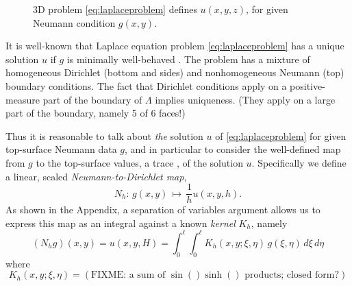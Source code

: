\documentclass[letterpaper,final,12pt,reqno]{amsart}
\theoremstyle{cstyle}
\theoremstyle{cstyle*}
\theoremstyle{dstyle}
\newcommand{\grad}{\nabla}
\begin{document}
\begin{figure}[ht]
\caption{3D problem \eqref{eq:laplaceproblem} defines $u(x,y,z)$, for given Neumann condition $g(x,y)$.}
\label{fig:laplaceproblem}
\end{figure}

It is well-known that Laplace equation problem \eqref{eq:laplaceproblem} has a unique solution $u$ if $g$ is minimally well-behaved \cite{Elmanetal2014,Evans2010}.  The problem has a mixture of homogeneous Dirichlet (bottom and sides) and nonhomogeneous Neumann (top) boundary conditions.  The fact that Dirichlet conditions apply on a positive-measure part of the boundary of $\Lambda$ implies uniqueness.  (They apply on a large part of the boundary, namely 5 of 6 faces!)

Thus it is reasonable to talk about \emph{the} solution $u$ of \eqref{eq:laplaceproblem} for given top-surface Neumann data $g$, and in particular to consider the well-defined map from $g$ to the top-surface values, a trace \cite{Evans2010}, of the solution $u$.  Specifically we define a linear, scaled \emph{Neumann-to-Dirichlet map},
\begin{equation}
N_h : \, g(x,y) \, \mapsto \, \frac{1}{h} u(x,y,h).  \label{eq:ntod}
\end{equation}
As shown in the Appendix, a separation of variables argument allows us to express this map as an integral against a known \emph{kernel} $K_h$, namely
\begin{equation}
(N_h g)(x,y) = u(x,y,H) = \int_0^\ell \int_0^\ell K_h(x,y;\xi,\eta)\, g(\xi,\eta)\,d\xi\,d\eta  \label{eq:ntodformula}
\end{equation}
where
\begin{equation}
K_h(x,y;\xi,\eta) = (\text{FIXME: a sum of $\sin() \sinh()$ products; closed form?})  \label{eq:kernelformula}
\end{equation}
\end{document}
